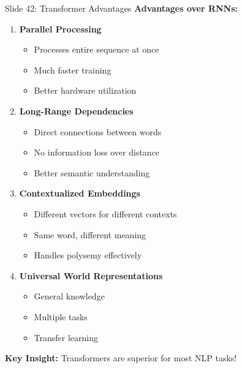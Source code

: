 \documentclass[8pt]{beamer}
\begin{document}
	\begin{frame}{Slide 42: Transformer Advantages}
		\fontsize{6.5}{7.5}\selectfont
		\textbf{Advantages over RNNs:}
		\begin{enumerate}
			\item \textbf{Parallel Processing}
			\begin{itemize}
				\item Processes entire sequence at once
				\item Much faster training
				\item Better hardware utilization
			\end{itemize}
			\item \textbf{Long-Range Dependencies}
			\begin{itemize}
				\item Direct connections between words
				\item No information loss over distance
				\item Better semantic understanding
			\end{itemize}
			\item \textbf{Contextualized Embeddings}
			\begin{itemize}
				\item Different vectors for different contexts
				\item Same word, different meaning
				\item Handles polysemy effectively
			\end{itemize}
			\item \textbf{Universal World Representations}
			\begin{itemize}
				\item General knowledge
				\item Multiple tasks
				\item Transfer learning
			\end{itemize}
		\end{enumerate}
		
		\textcolor{myblue}{\textbf{Key Insight:}} Transformers are superior for most NLP tasks!
	\end{frame}
	
\end{document}
